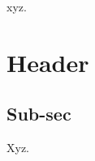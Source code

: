 \documentclass[11pt]{scrartcl} %
\begin{document}
xyz.


\section{Header}




\subsection{Sub-sec}

Xyz.

\end{document}
